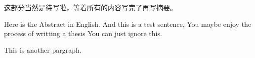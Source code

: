 
\begin{cabstract}
这部分当然是待写啦，等着所有的内容写完了再写摘要。
\end{cabstract}

\begin{eabstract}
Here is the Abstract in English. And this is a test sentence, You maybe enjoy
the process of writting a thesis You can just ignore this.\par
This is another pargraph.
\end{eabstract}